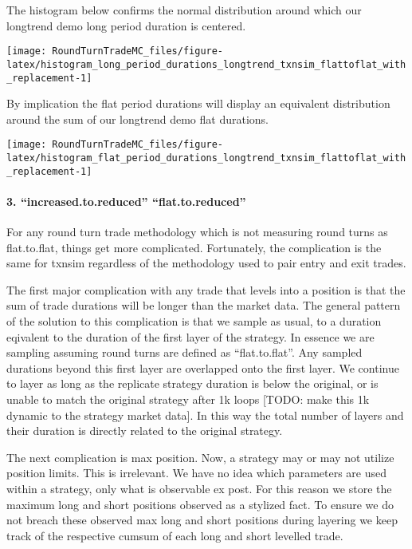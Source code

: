 The histogram below confirms the normal distribution around which our
longtrend demo long period duration is centered.

\begin{Schunk}

\texttt{[image: RoundTurnTradeMC\_files/figure-latex/histogram\_long\_period\_durations\_longtrend\_txnsim\_flattoflat\_with\_replacement-1]} \end{Schunk}

By implication the flat period durations will display an equivalent
distribution around the sum of our longtrend demo flat durations.

\begin{Schunk}

\texttt{[image: RoundTurnTradeMC\_files/figure-latex/histogram\_flat\_period\_durations\_longtrend\_txnsim\_flattoflat\_with\_replacement-1]} \end{Schunk}

\hypertarget{increased.to.reduced-flat.to.reduced}{%
\paragraph{3. ``increased.to.reduced'' \textbar{}\textbar{}
``flat.to.reduced''}\label{increased.to.reduced-flat.to.reduced}}

For any round turn trade methodology which is not measuring round turns
as flat.to.flat, things get more complicated. Fortunately, the
complication is the same for txnsim regardless of the methodology used
to pair entry and exit trades.

The first major complication with any trade that levels into a position
is that the sum of trade durations will be longer than the market data.
The general pattern of the solution to this complication is that we
sample as usual, to a duration eqivalent to the duration of the first
layer of the strategy. In essence we are sampling assuming round turns
are defined as ``flat.to.flat''. Any sampled durations beyond this first
layer are overlapped onto the first layer. We continue to layer as long
as the replicate strategy duration is below the original, or is unable
to match the original strategy after 1k loops {[}TODO: make this 1k
dynamic to the strategy market data{]}. In this way the total number of
layers and their duration is directly related to the original strategy.

The next complication is max position. Now, a strategy may or may not
utilize position limits. This is irrelevant. We have no idea which
parameters are used within a strategy, only what is observable ex post.
For this reason we store the maximum long and short positions observed
as a stylized fact. To ensure we do not breach these observed max long
and short positions during layering we keep track of the respective
cumsum of each long and short levelled trade.

